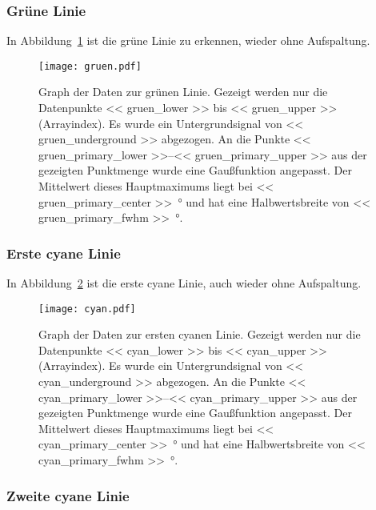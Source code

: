 \subsubsection{Grüne Linie}

In Abbildung~\ref{fig:gruen} ist die grüne Linie zu erkennen, wieder ohne
Aufspaltung.

\begin{figure}[htbp]
    \centering
    \texttt{[image: gruen.pdf]}
    \caption{%
        Graph der Daten zur grünen Linie. Gezeigt werden nur die Datenpunkte
        \num{<< gruen_lower >>} bis \num{<< gruen_upper >>} (Arrayindex). Es
        wurde ein Untergrundsignal von \num{<< gruen_underground >>} abgezogen.  An die
        Punkte \numrange{<< gruen_primary_lower >>}{<< gruen_primary_upper >>} aus
        der gezeigten Punktmenge wurde eine Gaußfunktion angepasst. Der
        Mittelwert dieses Hauptmaximums liegt bei \SI{<< gruen_primary_center
        >>}{\degree} und hat eine Halbwertsbreite von \SI{<< gruen_primary_fwhm
        >>}{\degree}.
    }
    \label{fig:gruen}
\end{figure}

\subsubsection{Erste cyane Linie}

In Abbildung~\ref{fig:cyan} ist die erste cyane Linie, auch wieder ohne
Aufspaltung.

\begin{figure}[htbp]
    \centering
    \texttt{[image: cyan.pdf]}
    \caption{%
        Graph der Daten zur ersten cyanen Linie. Gezeigt werden nur die
        Datenpunkte \num{<< cyan_lower >>} bis \num{<< cyan_upper >>}
        (Arrayindex). Es wurde ein Untergrundsignal von \num{<< cyan_underground
        >>} abgezogen. An die Punkte \numrange{<< cyan_primary_lower >>}{<<
        cyan_primary_upper >>} aus der gezeigten Punktmenge wurde eine
        Gaußfunktion angepasst. Der Mittelwert dieses Hauptmaximums liegt bei
        \SI{<< cyan_primary_center >>}{\degree} und hat eine Halbwertsbreite von
        \SI{<< cyan_primary_fwhm >>}{\degree}.
    }
    \label{fig:cyan}
\end{figure}

\subsubsection{Zweite cyane Linie}


